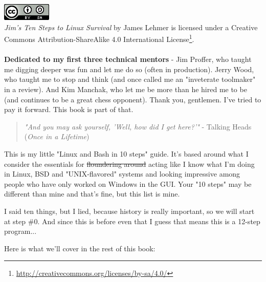 \documentclass[10pt,]{book}
\renewcommand{\href}[2]{#2\footnote{\url{#1}}}
\numberwithin{figure}{chapter}
\begin{document}
~\\\hspace*{0.333em}\\\includegraphics{./images/cc-by-sa.png}\\\emph{Jim's
Ten Steps to Linux Survival} by James Lehmer is licensed under a
\href{http://creativecommons.org/licenses/by-sa/4.0/}{Creative Commons
Attribution-ShareAlike 4.0 International License}.
~\\\hspace*{0.333em}\\\textbf{Dedicated to my first three technical
mentors} - Jim Proffer, who taught me digging deeper was fun and let me
do so (often in production). Jerry Wood, who taught me to stop and think
(and once called me an "inveterate toolmaker" in a review). And Kim
Manchak, who let me be more than he hired me to be (and continues to be
a great chess opponent). Thank you, gentlemen. I've tried to pay it
forward. This book is part of that.

\pagestyle{fancy} \fancyhead{}
\fancyhead[RO]{\slshape \leftmark} \renewcommand{\headrulewidth}{0.4pt}


\begin{quote}
\emph{"And you may ask yourself, 'Well, how did I get here?'"} - Talking
Heads (\emph{Once in a Lifetime})
\end{quote}

This is my little "Linux and Bash in 10 steps" guide. It's based around
what I consider the essentials for \sout{floundering around} acting like
I know what I'm doing in Linux, BSD and "UNIX-flavored" systems and
looking impressive among people who have only worked on Windows in the
GUI. Your "10 steps" may be different than mine and that's fine, but
this list is mine.

I said ten things, but I lied, because history is really important, so
we will start at step \#0. And since this is before even that I guess
that means this is a 12-step program...

Here is what we'll cover in the rest of this book:
\end{document}
